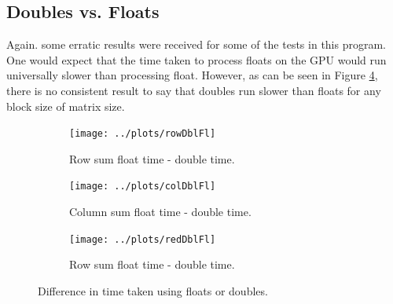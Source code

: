 \documentclass[12pt]{article}
\begin{document}
\subsection*{Doubles vs. Floats}
    Again. some erratic results were received for some of the tests in this program. One would expect that the time taken to process floats on the GPU would run universally slower than processing float. However, as can be seen in Figure \ref{fig:dbl}, there is no consistent result to say that doubles run slower than floats for any block size of matrix size.
    \begin{figure}
        \centering
        \begin{subfigure}{0.32\textwidth}
            \centering
            \texttt{[image: ../plots/rowDblFl]}
            \caption{Row sum float time - double time.}
            \label{fig:rowdbl}
        \end{subfigure}
        \begin{subfigure}{0.32\textwidth}
            \centering
            \texttt{[image: ../plots/colDblFl]}
            \caption{Column sum float time - double time.}
            \label{fig:coldbl}
        \end{subfigure}
        \begin{subfigure}{0.32\textwidth}
            \centering
            \texttt{[image: ../plots/redDblFl]}
            \caption{Row sum float time - double time.}
            \label{fig:reddbl}
        \end{subfigure}
        \caption{Difference in time taken using floats or doubles.}
        \label{fig:dbl}
    \end{figure}
\end{document}
